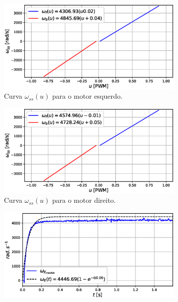 \begin{figure}[H]
    \begin{subfigure}{.5\textwidth}
    \centering
    \includegraphics[width=\textwidth]{figuras/resultados/exp02/curva_feedforward_esquerdo100.eps}
    \caption{Curva $\omega_{ss}(u)$ para o motor esquerdo.}
    \label{fig:exp02:curva_feedforward_esquerdo}
    \end{subfigure}
    \hfill
    \begin{subfigure}{.5\textwidth}
    \centering
    \includegraphics[width=\textwidth]{figuras/resultados/exp02/curva_feedforward_direito100.eps}
    \caption{Curva $\omega_{ss}(u)$ para o motor direito.}
    \label{fig:exp02:curva_feedforward_direito}
    \end{subfigure}
    \begin{subfigure}{.5\textwidth}
    \centering
    \includegraphics[width=\textwidth]{figuras/resultados/exp02/regressao_vs_medido_esquerdo100.eps}

\end{subfigure}
\end{figure}
